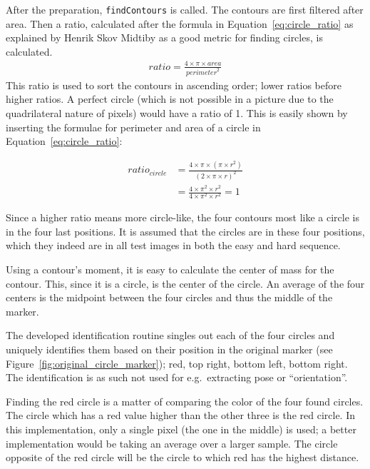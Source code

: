 After the preparation, \verb|findContours| is called.
The contours are first filtered after area.
Then a ratio, calculated after the formula in Equation~\vref{eq:circle_ratio} as explained by Henrik Skov Midtiby as a good metric for finding circles, is calculated.
\begin{align}\label{eq:circle_ratio}
    \mathit{ratio} = \frac{4\times\pi\times\mathit{area}}{\mathit{perimeter}^2}
\end{align}
This ratio is used to sort the contours in ascending order; lower ratios before higher ratios.
A perfect circle (which is not possible in a picture due to the quadrilateral nature of pixels) would have a ratio of 1.
This is easily shown by inserting the formulae for perimeter and area of a circle in Equation~\ref{eq:circle_ratio}:

\begin{align}
    \mathit{ratio}_\mathit{circle}  &= \frac{4\times\pi\times(\pi\times r^2)}{(2\times\pi\times r)^2}\nonumber \\
                                    &= \frac{4\times\pi^2\times r^2}{4\times\pi^2\times r^2} = 1
\end{align}

Since a higher ratio means more circle-like, the four contours most like a circle is in the four last positions.
It is assumed that the circles are in these four positions, which they indeed are in all test images in both the easy and hard sequence.

Using a contour's moment, it is easy to calculate the center of mass for the contour.
This, since it is a circle, is the center of the circle.
An average of the four centers is the midpoint between the four circles and thus the middle of the marker.

The developed identification routine singles out each of the four circles and uniquely identifies them based on their position in the original marker (see Figure~\vref{fig:original_circle_marker}); red, top right, bottom left, bottom right.
The identification is as such not used for e.g.\ extracting pose or ``orientation''.

Finding the red circle is a matter of comparing the color of the four found circles.
The circle which has a red value higher than the other three is the red circle.
In this implementation, only a single pixel (the one in the middle) is used; a better implementation would be taking an average over a larger sample.
The circle opposite of the red circle will be the circle to which red has the highest distance.

